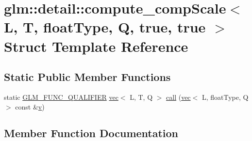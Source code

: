 \hypertarget{structglm_1_1detail_1_1compute__comp_scale_3_01_l_00_01_t_00_01float_type_00_01_q_00_01true_00_01true_01_4}{}\section{glm\+:\+:detail\+:\+:compute\+\_\+comp\+Scale$<$ L, T, float\+Type, Q, true, true $>$ Struct Template Reference}
\label{structglm_1_1detail_1_1compute__comp_scale_3_01_l_00_01_t_00_01float_type_00_01_q_00_01true_00_01true_01_4}
\subsection*{Static Public Member Functions}
\begin{DoxyCompactItemize}
\item 
static \hyperlink{setup_8hpp_a33fdea6f91c5f834105f7415e2a64407}{G\+L\+M\+\_\+\+F\+U\+N\+C\+\_\+\+Q\+U\+A\+L\+I\+F\+I\+ER} \hyperlink{structglm_1_1vec}{vec}$<$ L, T, Q $>$ \hyperlink{structglm_1_1detail_1_1compute__comp_scale_3_01_l_00_01_t_00_01float_type_00_01_q_00_01true_00_01true_01_4_a49d34acc164a29cf170f74fb96eaa84d}{call} (\hyperlink{structglm_1_1vec}{vec}$<$ L, float\+Type, Q $>$ const \&\hyperlink{_s_d_l__opengl_8h_a10a82eabcb59d2fcd74acee063775f90}{v})
\end{DoxyCompactItemize}


\subsection{Member Function Documentation}
\mbox{\label{structglm_1_1detail_1_1compute__comp_scale_3_01_l_00_01_t_00_01float_type_00_01_q_00_01true_00_01true_01_4_a49d34acc164a29cf170f74fb96eaa84d}} 
